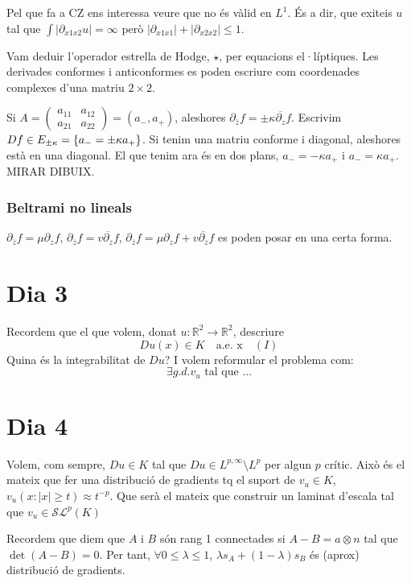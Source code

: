 Pel que fa a CZ ens interessa veure que no és vàlid en $L^1$. És a dir, que exiteis $u$ tal que $\int|\partial_{x1x2}u|=\infty$ però $|\partial_{x1x1}|+|\partial_{x2x2}|\le 1$.

Vam deduir l'operador estrella de Hodge, $\star$, per equacions el·líptiques. Les derivades conformes i anticonformes es poden escriure com coordenades complexes d'una matriu $2\times 2$. 

Si $A = \begin{pmatrix}a_{11}&a_{12}\\a_{21}&a_{22}\end{pmatrix} = (a_-,a_+)$, aleshores $\partial_{\overline z}f = \pm \kappa\overline{\partial_z}f$.
Escrivim $Df \in E_{\pm\kappa} = \{a_-=\pm\kappa a_+\}$. Si tenim una matriu conforme i diagonal, aleshores està en una diagonal. El que tenim ara és en dos plans, $a_-=-\kappa a_+$ i $a_-=\kappa a_+$. MIRAR DIBUIX.

\subsubsection{Beltrami no lineals}
$\partial_{\overline z}f = \mu\partial_z f$, ${\partial_{\overline z}f} = v\overline{\partial_z}f$, $\partial_{\overline z}f =\mu\partial_z f + v\overline{\partial_z}f$
es poden posar en una certa forma.



\section{Dia 3}
Recordem que el que volem, donat $u:\mathbb R^2\to\mathbb R^2$, descriure 
$$Du(x)\in K\quad\textrm{a.e. x}\quad (I)$$
Quina és la integrabilitat de $Du$? 
I volem reformular el problema com:
$$\exists g.d. v_u \text{ tal que } ...$$





\section{Dia 4}
Volem, com sempre, $Du\in K$ tal que $Du\in L^{p,\infty}\setminus L^p$ per algun $p$ crític.
Això és el mateix que fer una distribució de gradients tq el suport de $v_u\in K$, $v_u(x:|x|\ge t)\approx t^{-p}$.
Que serà el mateix que construir un laminat d'escala tal que $v_u\in\mathcal{SL}^p(K)$ 

Recordem que diem que $A$ i $B$ són rang 1 connectades si $A-B=a\otimes n$ tal que $\det(A-B)=0$. Per tant, $\forall 0\le\lambda\le1$, $\lambda s_A+(1-\lambda)s_B$ és (aprox) distribució de gradients.

